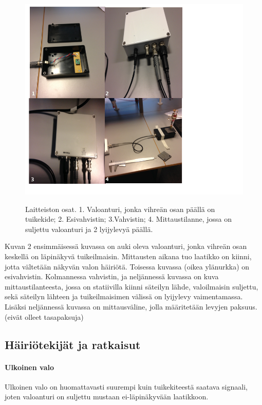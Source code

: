 \documentclass[a4paper, 12pt]{article}
\begin{document}
\begin{figure}[!hbt]
\includegraphics[scale=0.9]{LaitteistonOsat}
\label{fig:LaitteistonOsat}
\caption{Laitteiston osat. 1. Valoanturi, jonka vihreän osan päällä on tuikekide; 2. Esivahvistin; 3.Vahvistin; 4. Mittaustilanne, jossa on suljettu valoanturi ja 2 lyijylevyä päällä.}
\end{figure}

Kuvan 2 ensimmäisessä kuvassa on auki oleva valoanturi, jonka vihreän osan keskellä on läpinäkyvä tuikeilmaisin. Mittausten aikana tuo laatikko on kiinni, jotta vältetään näkyvän valon häiriötä. Toisessa kuvassa (oikea ylänurkka) on esivahvistin. Kolmannessa vahvistin, ja neljännessä kuvassa on kuva mittaustilanteesta, jossa on statiivilla kiinni säteilyn lähde, valoilmaisin suljettu, sekä säteilyn lähteen ja tuikeilmaisimen välissä on lyijylevy vaimentamassa. Lisäksi neljännessä kuvassa on mittausväline, jolla määritetään levyjen paksuus. (eivät olleet tasapaksuja)

\subsection*{Häiriötekijät ja ratkaisut}
\paragraph{Ulkoinen valo\\}
Ulkoinen valo on huomattavasti suurempi kuin tuikekiteestä saatava signaali, joten valoanturi on suljettu mustaan ei-läpinäkyvään laatikkoon.
\end{document}
